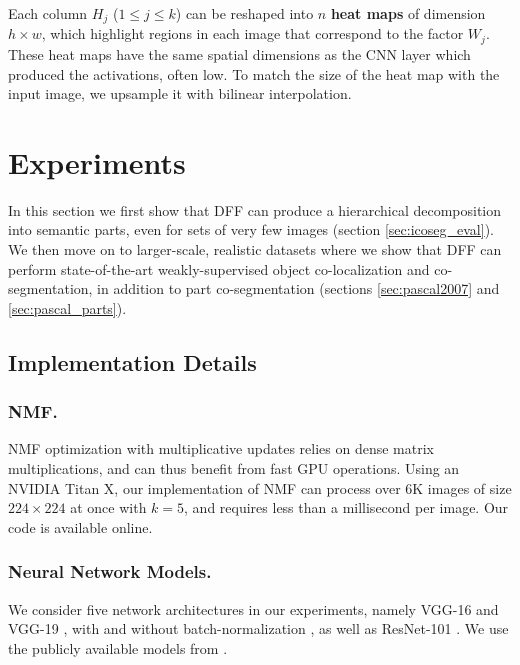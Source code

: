 \documentclass[runningheads]{llncs}
\begin{document}
	Each column $H_j$ ($1\leq j\leq k$) can be reshaped into $n$ \textbf{heat maps} of dimension $h\times w$, which highlight regions in each image that correspond to the factor $W_j$. These heat maps have the same spatial dimensions as the CNN layer which produced the activations, often low. To match the size of the heat map with the input image, we upsample it with bilinear interpolation.

	\section{Experiments} \label{sec:experiments}
	
	In this section we first show that DFF can produce a hierarchical decomposition into semantic parts, even for sets of very few images (section \ref{sec:icoseg_eval}). We then move on to larger-scale, realistic datasets where we show that DFF can perform state-of-the-art weakly-supervised object co-localization and co-segmentation, in addition to part co-segmentation (sections \ref{sec:pascal2007} and \ref{sec:pascal_parts}).

	\subsection{Implementation Details}

	\subsubsection{NMF.} NMF optimization with multiplicative updates \cite{lee2001algorithms} relies on dense matrix multiplications, and can thus benefit from fast GPU operations. Using an NVIDIA Titan X, our implementation of NMF can process over 6K images of size $224\times 224$ at once with $k=5$,  and requires less than a millisecond per image. Our code is available online.

	
	\subsubsection{Neural Network Models.}
	We consider five network architectures in our experiments, namely VGG-16 and VGG-19 \cite{Simonyan2014}, with and without batch-normalization \cite{Joffe2015}, as well as ResNet-101 \cite{He2016}. We use the publicly available models from \cite{Paszke2017}.
\end{document}

